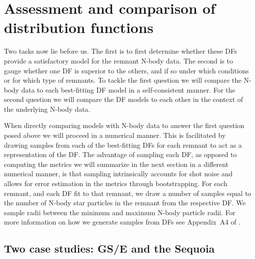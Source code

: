 

\section{Assessment and comparison of distribution functions}
\label{ch4:sec:assessment-comparison-distribution-functions}

Two tasks now lie before us. The first is to first determine whether these DFs provide a satisfactory model for the remnant N-body data. The second is to gauge whether one DF is superior to the others, and if so under which conditions or for which type of remnants. To tackle the first question we will compare the N-body data to each best-fitting DF model in a self-consistent manner. For the second question we will compare the DF models to each other in the context of the underlying N-body data.

When directly comparing models with N-body data to answer the first question posed above we will proceed in a numerical manner. This is facilitated by drawing samples from each of the best-fitting DFs for each remnant to act as a representation of the DF. The advantage of sampling each DF, as opposed to computing the metrics we will summarize in the next section in a different numerical manner, is that sampling intrinsically accounts for shot noise and allows for error estimation in the metrics through bootstrapping. For each remnant, and each DF fit to that remnant, we draw a number of samples equal to the number of N-body star particles in the remnant from the respective DF. We sample radii between the minimum and maximum N-body particle radii. For more information on how we generate samples from DFs see Appendix~A4 of \textcite{lane23}.

\subsection{Two case studies: GS/E and the Sequoia}
\label{ch4:subsec:case-studies}

